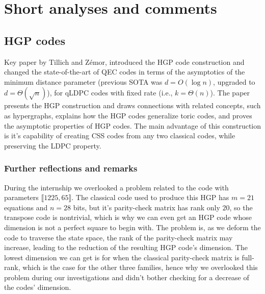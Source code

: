 \documentclass{article}
\begin{document}
\section{Short analyses and comments}

\subsection{HGP codes} \label{HGP_subsec}

Key paper by Tillich and Zémor, introduced the HGP code construction and changed the state-of-the-art of QEC codes in terms of the asymptotics of the minimum distance parameter (previous SOTA was $d = O(\log n)$, upgraded to $d = \Theta(\sqrt{n})$), for qLDPC codes with fixed rate (i.e., $k = \Theta(n)$). The paper presents the HGP construction and draws connections with related concepts, such as hypergraphs, explains how the HGP codes generalize toric codes, and proves the asymptotic properties of HGP codes. The main advantage of this construction is it's capability of creating CSS codes from any two classical codes, while preserving the LDPC property. 

\subsubsection{Further reflections and remarks}

During the internship we overlooked a problem related to the code with parameters $\llbracket1225, 65\rrbracket$. The classical code used to produce this HGP has $m = 21$ equations and $n = 28$ bits, but it's parity-check matrix has rank only $20$, so the transpose code is nontrivial, which is why we can even get an HGP code whose dimension is not a perfect square to begin with. The problem is, as we deform the code to traverse the state space, the rank of the parity-check matrix may increase, leading to the reduction of the resulting HGP code's dimension. The lowest dimension we can get is for when the classical parity-check matrix is full-rank, which is the case for the other three families, hence why we overlooked this problem during our investigations and didn't bother checking for a decrease of the codes' dimension. 
\end{document}
